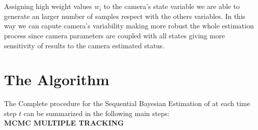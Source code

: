 \\
\\
Assigning high weight values $w_i$ to the camera's state variable we are able to generate an larger number of samples respect with the others variables. In this way we can capute camera's variability making more robust the whole estimation process since camera parameters are coupled with all states giving more sensitivity of results to the camera estimated status.\\

\newpage
\section{The Algorithm}
The Complete procedure for the Sequential Bayesian Estimation of  at each time step $t$ can be summarized in the following  main steps:
\\
{\bf MCMC MULTIPLE TRACKING }\\[.4cm]
